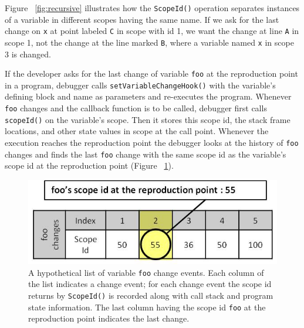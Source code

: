 \documentclass[runningheads,a4paper]{llncs}
\begin{document}
Figure ~\ref{fig:recursive} illustrates how the \texttt{ScopeId()} operation separates instances 
of a variable in different scopes having the same name.
If we ask for the last change on \texttt{x} at point labeled \texttt{C} in scope with id 1, we want the change at line \texttt{A} in scope 1, not 
the change at the line marked \texttt{B}, where a variable named \texttt{x} in scope 3 is changed.  


If the developer asks for the last change of variable \texttt{foo} at the 
reproduction point in a program, debugger calls 
\texttt{setVariableChangeHook()} with the variable's defining
block and name as parameters and re-executes the
program. Whenever \texttt{foo} changes and the callback function is to
be called, debugger first calls \texttt{scopeId()} on the
variable's scope. Then it stores this scope id, the stack
frame locations, and other state values in scope at the call point.
Whenever the execution reaches the reproduction point the debugger
looks at the history of \texttt{foo} changes and finds the last
\texttt{foo} change with the same scope id as the variable's scope id
at the reproduction point (Figure ~\ref{fig:foo-changes2}). 

\begin{figure}[htp]
\centering 
\includegraphics[height=.14\textheight]{7-foo-changes2.jpg}
\caption{A hypothetical list of variable \texttt{foo} change events. Each column of the list indicates a change event; for each
change event the scope id returns by \texttt{ScopeId()} is recorded along with call stack and program state information. 
   The last column having the scope id \texttt{foo} at the reproduction point indicates 
  the last change.}
\label{fig:foo-changes2}
\end{figure}
\end{document}
